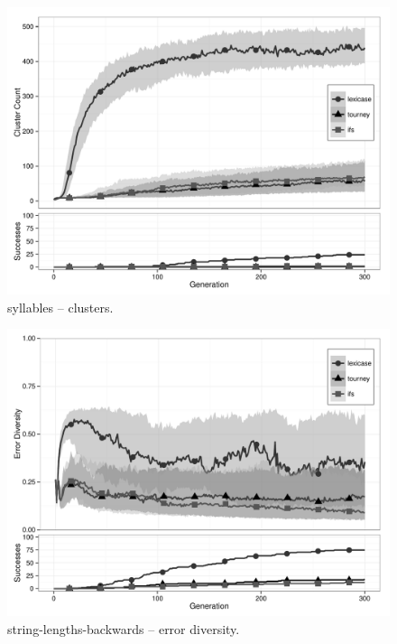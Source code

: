 \begin{figure}[p] %
\centering
\includegraphics[width=11.5cm]{syllables-cluster.pdf}
\caption{syllables -- clusters.}
\label{syllablesClu}
\end{figure}

\begin{figure}[p] %
\centering
\includegraphics[width=11.5cm]{string-lengths-backwards-diversity.pdf}
\caption{string-lengths-backwards -- error diversity.}
\label{string-lengths-backwardsDiv}
\end{figure}

